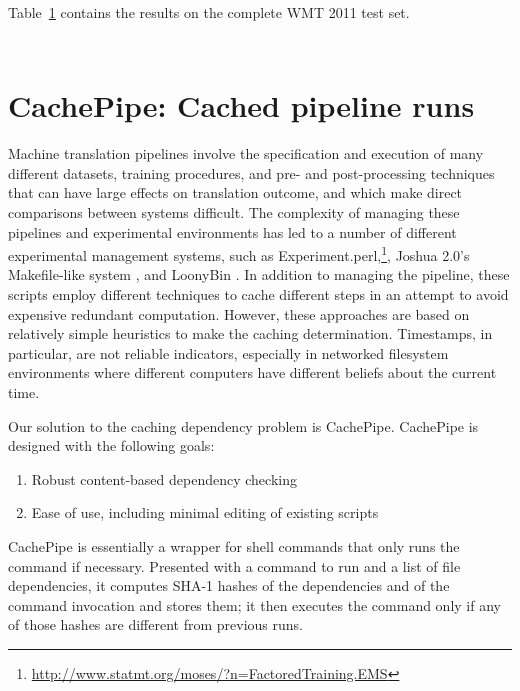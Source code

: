 \documentclass[11pt]{article}
\begin{document}
Table~\ref{table:results} contains the results on the complete WMT 2011 test set.

\begin{table}[t]
  \centering
  \begin{tabular}{cc}
  \end{tabular}
  \caption{}
  \label{table:results}
\end{table}

\section{CachePipe: Cached pipeline runs}

Machine translation pipelines involve the specification and execution
of many different datasets, training procedures, and pre- and
post-processing techniques that can have large effects on translation
outcome, and which make direct comparisons between systems difficult.
The complexity of managing these pipelines and experimental
environments has led to a number of different experimental management
systems, such as
Experiment.perl,\footnote{\url{http://www.statmt.org/moses/?n=FactoredTraining.EMS}},
Joshua 2.0's Makefile-like system \cite{li2010joshua}, and LoonyBin
\cite{clark2010loonybin}.  In addition to managing the pipeline, these
scripts employ different techniques to cache different steps in an
attempt to avoid expensive redundant computation.  However, these
approaches are based on relatively simple heuristics to make the
caching determination.  Timestamps, in particular, are not reliable
indicators, especially in networked filesystem environments where
different computers have different beliefs about the current time.

Our solution to the caching dependency problem is CachePipe.
CachePipe is designed with the following goals:

\begin{enumerate}
\item Robust content-based dependency checking
\item Ease of use, including minimal editing of existing scripts
\end{enumerate}

\noindent CachePipe is essentially a wrapper for shell commands that
only runs the command if necessary.  Presented with a command to run
and a list of file dependencies, it computes SHA-1 hashes of
the dependencies and of the command invocation and stores them; it
then executes the command only if any of those hashes are different
from previous runs.
\end{document}
